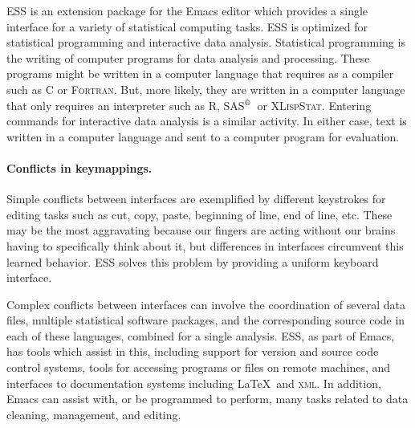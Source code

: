 \documentclass{article}
\newcommand*{\SAS}{\textsc{SAS}$^{\mbox{\scriptsize\textregistered}}$}
\newcommand*{\XLispStat}{\textsc{XLispStat}}
\newcommand*{\Fortran}{\textsc{Fortran}}
\begin{document}
ESS is an extension package for
the Emacs editor which provides a single interface for a variety of
statistical computing tasks.  ESS is optimized for statistical programming
and interactive data analysis.  Statistical programming is the writing of
computer programs for data analysis and processing.  These programs might be
written in a computer language that requires as a compiler such as C or
\Fortran.  But, more likely, they are written in a  computer
language that only requires an interpreter such as R, \SAS\ or \XLispStat.
Entering commands for interactive data analysis is a similar activity.
In either case, text is written in a computer language and sent to a
computer program for evaluation.

\paragraph{Conflicts in keymappings.}
\label{sec:confl-keym}

Simple conflicts between interfaces are exemplified by different
keystrokes for editing tasks such as cut, copy, paste, beginning of
line, end of line, etc.  These may be the most aggravating
because our fingers are acting without our brains having to
specifically think about it, but differences in interfaces
circumvent this learned behavior.  ESS solves this problem by
providing a uniform keyboard interface.

Complex conflicts between interfaces can involve the coordination of
several data files, multiple statistical software packages, and the
corresponding source code in each of these languages, combined for a
single analysis.  ESS, as part of Emacs, has tools which assist in
this, including support for version and source code control systems,
tools for accessing programs or files on remote machines, and
interfaces to documentation systems including \LaTeX\ and
\textsc{xml}.  In addition, Emacs can assist with, or be programmed to
perform, many tasks related to data cleaning, management, and editing.
\end{document}
